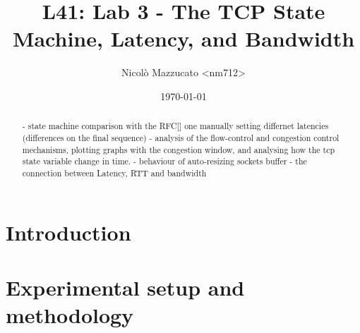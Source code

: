 \documentclass[a4paper,10pt]{article}
\begin{document}
\title{L41: Lab 3 - The TCP State Machine, Latency, and Bandwidth}
\author{Nicolò Mazzucato \textless{}nm712\textgreater{}}
\date{\today}

\maketitle

\thispagestyle{empty}

\begin{abstract}           

   - state machine comparison with the RFC[] one manually setting differnet latencies (differences on the final sequence)
   - analysis of the flow-control and congestion control mechanisms, plotting graphs with the congestion window, and analysing how the tcp state variable change in time.
   - behaviour of auto-resizing sockets buffer
   - the connection between Latency, RTT and bandwidth


\end{abstract}

\clearpage

\setcounter{page}{1}

\section{Introduction}


\section{Experimental setup and methodology}
\end{document}
